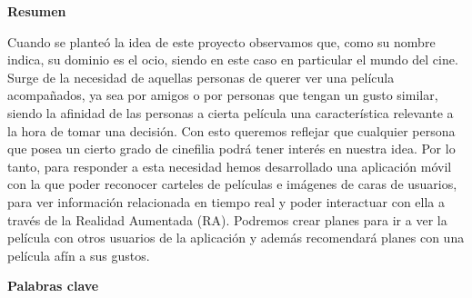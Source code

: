 
\newpage

\thispagestyle{empty}

\begin{center}

{\bf \Huge Resumen}

  \end{center}
\vspace{1cm}
\begin{flushleft}
Cuando se planteó la idea de este proyecto observamos que, como su nombre indica, 
su dominio es el ocio, siendo en este caso en particular el mundo del cine.
Surge de la necesidad de aquellas personas de querer ver una película acompañados, 
ya sea por amigos o por personas que tengan un gusto similar, 
siendo la afinidad de las personas a cierta película una característica relevante a 
la hora de tomar una decisión. Con esto queremos reflejar que 
cualquier persona que posea un cierto grado de cinefilia podrá tener interés en nuestra 
idea.
Por lo tanto, para responder a esta necesidad hemos desarrollado una aplicación móvil 
con la que poder reconocer carteles de películas e imágenes de caras de usuarios, para 
ver información relacionada en tiempo real y poder interactuar con ella a 
través de la Realidad Aumentada (RA). Podremos crear planes para ir a ver la película con otros 
usuarios de la aplicación y además recomendará planes con una película afín a sus gustos.

\end{flushleft}

\vspace{1cm}


\begin{center}

{\bf \Large Palabras clave}

   \end{center}

   \vspace{0.5cm}
   
